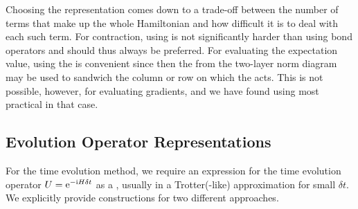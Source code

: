 Choosing the representation comes down to a trade-off between the number of terms that make up the whole Hamiltonian and how difficult it is to deal with each such term.
%
For  contraction, using  is not significantly harder than using bond operators and should thus always be preferred.
%
For evaluating the expectation value, using the  is convenient since then the  from the two-layer norm diagram may be used to sandwich the column or row on which the  acts.
%
This is not possible, however, for evaluating gradients, and we have found using  most practical in that case.

\subsection{Evolution Operator Representations}

For the time evolution method, we require an expression for the time evolution operator $U = \mathrm{e}^{-\mathrm{i} H \delta t}$ as a , usually in a Trotter(-like) approximation for small $\delta t$.
%
We explicitly provide constructions for two different approaches.


